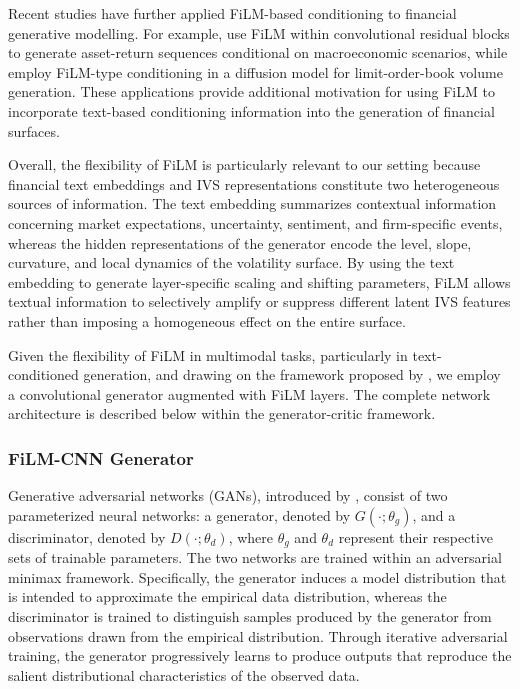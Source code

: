 Recent studies have further applied FiLM-based conditioning to financial generative modelling. For example, \citet{kubiak2025macrovae} use FiLM within convolutional residual blocks to generate asset-return sequences conditional on macroeconomic scenarios, while \citet{wang2025diffvolume} employ FiLM-type conditioning in a diffusion model for limit-order-book volume generation. These applications provide additional motivation for using FiLM to incorporate text-based conditioning information into the generation of financial surfaces.



Overall, the flexibility of FiLM is particularly relevant to our setting because financial text embeddings and IVS representations constitute two heterogeneous sources of information. The text embedding summarizes contextual information concerning market expectations, uncertainty, sentiment, and firm-specific events, whereas the hidden representations of the generator encode the level, slope, curvature, and local dynamics of the volatility surface. By using the text embedding to generate layer-specific scaling and shifting parameters, FiLM allows textual information to selectively amplify or suppress different latent IVS features rather than imposing a homogeneous effect on the entire surface.




Given the flexibility of FiLM in multimodal tasks, particularly in text-conditioned generation, and drawing on the framework proposed by \citet{dumoulin2018feature}, we employ a convolutional generator augmented with FiLM layers. The complete network architecture is described below within the generator-critic framework.



\subsubsection*{FiLM-CNN Generator}
Generative adversarial networks (GANs), introduced by \citet{goodfellow2014generative}, consist of two parameterized neural networks: a generator, denoted by $G(\cdot;\theta_g)$, and a discriminator, denoted by $D(\cdot;\theta_d)$, where $\theta_g$ and $\theta_d$ represent their respective sets of trainable parameters. The two networks are trained within an adversarial minimax framework. Specifically, the generator induces a model distribution that is intended to approximate the empirical data distribution, whereas the discriminator is trained to distinguish samples produced by the generator from observations drawn from the empirical distribution. Through iterative adversarial training, the generator progressively learns to produce outputs that reproduce the salient distributional characteristics of the observed data.



